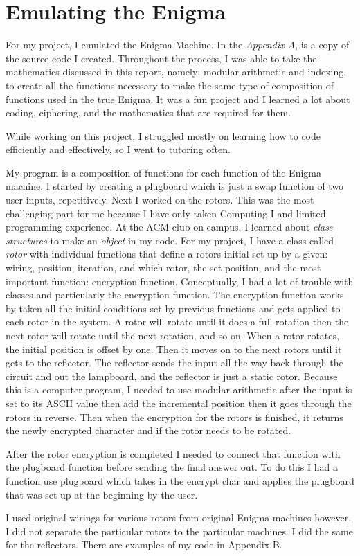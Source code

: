 \documentclass[12pt,letterpaper]{article} %
\begin{document}
\section{Emulating the Enigma}
For my project, I emulated the Enigma Machine.  In the \emph{Appendix A}, is a copy of the source code I created.  Throughout the process, I was able to take the mathematics discussed in this report, namely: modular arithmetic and indexing, to create all the functions necessary to make the same type of composition of functions used in the true Enigma. It was a fun project and I learned a lot about coding, ciphering, and the mathematics that are required for them. \par While working on this project, I struggled mostly on learning how to code efficiently and effectively, so I went to tutoring often. \par  My program is a composition of functions for each function of the Enigma machine.  I started by creating a plugboard which is just a swap function of two user inputs, repetitively.  Next I worked on the rotors.  This was the most challenging part for me because I have only taken Computing I and limited programming experience.  At the ACM club on campus, I learned about \emph{class structures} to make an \emph{object} in my code.  For my project, I have a class called \emph{rotor} with individual functions that define a rotors initial set up by a given: wiring, position, iteration, and which rotor, the set position, and the most important function: encryption function.  Conceptually, I had a lot of trouble with classes and particularly the encryption function.  The encryption function works by taken all the initial conditions set by previous functions and gets applied to each rotor in the system.  A rotor will rotate until it does a full rotation then the next rotor will rotate until the next rotation, and so on.  When a rotor rotates, the initial position is offset by one.  Then it moves on to the next rotors until it gets to the reflector.  The reflector sends the input all the way back through the circuit and out the lampboard, and the reflector is just a static rotor.  Because this is a computer program, I needed to use modular arithmetic after the input is set to its ASCII value then add the incremental position then it goes through the rotors in reverse. Then when the encryption for the rotors is finished, it returns the newly encrypted character and if the rotor needs to be rotated.  \par After the rotor encryption is completed I needed to connect that function with the plugboard function before sending the final answer out.  To do this I had a function use plugboard which takes in the encrypt char and applies the plugboard that was set up at the beginning by the user.
\par I used original wirings for various rotors from original Enigma machines however, I did not separate the particular rotors to the particular machines. I did the same for the reflectors.  There are examples of my code in Appendix B.
\end{document}
